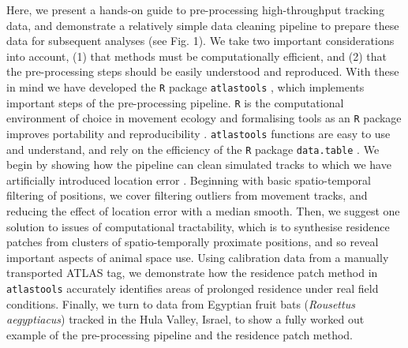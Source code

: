 \documentclass[10pt,paper=a4,headings=standardclasses
]{scrartcl}
\begin{document}
Here, we present a hands-on guide to pre-processing high-throughput tracking data, and demonstrate a relatively simple data cleaning pipeline to prepare these data for subsequent analyses (see Fig. 1). 
We take two important considerations into account, (1) that methods must be computationally efficient, and (2) that the pre-processing steps should be easily understood and reproduced.
With these in mind we have developed the \texttt{R} package \texttt{atlastools} \citep{gupte2020a, rcoreteam2020}, which implements important steps of the pre-processing pipeline.
\texttt{R} is the computational environment of choice in movement ecology \citep{joo2020} and formalising tools as an \texttt{R} package improves portability and reproducibility \citep{marwick2018}.
\texttt{atlastools} functions are easy to use and understand, and rely on the efficiency of the \texttt{R} package \texttt{data.table} \citep{dowle2020}.
We begin by showing how the pipeline can clean simulated tracks to which we have artificially introduced location error \citep{gurarie2017}.
Beginning with basic spatio-temporal filtering of positions, we cover filtering outliers from movement tracks, and reducing the effect of location error with a median smooth.
Then, we suggest one solution to issues of computational tractability, which is to synthesise residence patches \citep[\textit{sensu}][]{bijleveld2016, oudman2018, barraquand2008} from clusters of spatio-temporally proximate positions, and so reveal important aspects of animal space use.
Using calibration data from a manually transported ATLAS tag, we demonstrate how the residence patch method in \texttt{atlastools} accurately identifies areas of prolonged residence under real field conditions.
Finally, we turn to data from Egyptian fruit bats (\textit{Rousettus aegyptiacus}) tracked in the Hula Valley, Israel, to show a fully worked out example of the pre-processing pipeline and the residence patch method.
\end{document}
